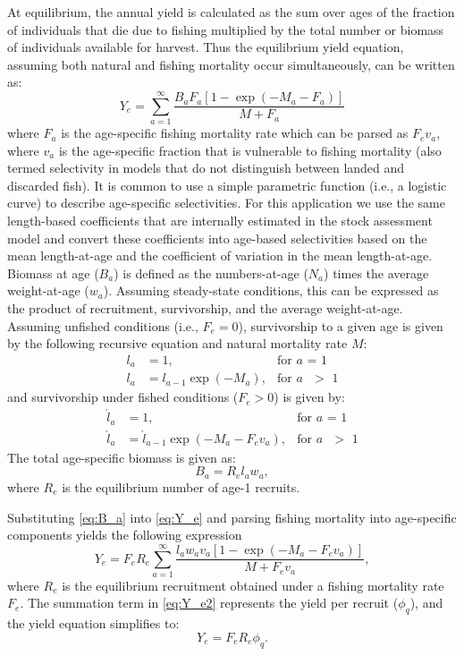 \documentclass[12pt,leqno]{article}
\begin{document}
At equilibrium, the annual yield is calculated as the sum over ages of the fraction of individuals that die due to fishing multiplied by the total number or biomass of individuals available for harvest.  Thus the equilibrium yield equation, assuming both natural and fishing mortality occur simultaneously,  can be written as:
\begin{equation}\label{eq:Y_e}
	Y_e = \sum_{a=1}^\infty \frac{B_a F_a [1-\exp(-M_a-F_a)]}{M+F_a}
\end{equation}
where $F_a$ is the age-specific fishing mortality rate which can be parsed as $F_e v_a$, where $v_a$ is the age-specific fraction that is vulnerable to fishing mortality (also termed selectivity in models that do not distinguish between landed and discarded fish).  It is common to use a simple parametric function (i.e., a logistic curve) to describe age-specific selectivities.  For this application we use the same length-based coefficients that are internally estimated in the stock assessment model and convert these coefficients into age-based selectivities based on the mean length-at-age and the coefficient of variation in the mean length-at-age.  Biomass at age ($B_a$) is defined as the numbers-at-age ($N_a$) times the average weight-at-age ($w_a$).  Assuming steady-state conditions, this can be expressed as the product of recruitment, survivorship, and the average weight-at-age.  Assuming unfished conditions (i.e., $F_e=0$), survivorship to a given age is given by the following recursive equation and natural mortality rate $M$:
\begin{align}\label{eq:unfished_survivorship}
	l_a &= 1,  &\mbox{for $a$ = 1} \nonumber \\
	l_a &= l_{a-1} \exp(-M_a),& \mbox{for $a$ $>$ 1}
\end{align}
and survivorship under fished conditions ($F_e > 0$) is given by:
\begin{align}\label{eq:fished_survivorship}
	\acute{l}_a &=1, &\mbox{for $a$ = 1} \nonumber\\
	\acute{l}_{a} &= \acute{l}_{a-1} \exp(-M_a-F_e v_a), &\mbox{for $a$ $>$ 1} 
\end{align}
The total age-specific biomass  is given as:
\begin{equation} \label{eq:B_a}
	B_a = R_e l_a w_a,
\end{equation}
where $R_e$ is the equilibrium number of age-1 recruits.

Substituting \eqref{eq:B_a} into  \eqref{eq:Y_e} and parsing fishing mortality into age-specific components yields the following expression
\begin{equation}\label{eq:Y_e2}
	Y_e = F_e R_e \sum_{a=1}^\infty \frac{l_a w_a v_a [1-\exp(-M_a-F_e v_a)]}{M+F_e v_a},
\end{equation}
where $R_e$ is the equilibrium recruitment obtained under a fishing mortality rate $F_e$. The summation term in \eqref{eq:Y_e2} represents the yield per recruit ($\phi_q$), and the yield equation simplifies to:
\begin{equation}\label{eq:Y_e3}
	Y_e = F_e R_e \phi_q.
\end{equation}
\end{document}
